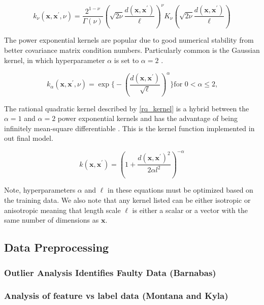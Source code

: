 \documentclass[journal=jacsat,manuscript=article]{achemso}
\begin{document}
\begin{equation}
    k_\nu(\mathbf{x}, \mathbf{x}^{\prime}, \nu) = \frac{2^{1-\nu}}{\Gamma(\nu)} \left( \sqrt{2\nu} \frac{d(\mathbf{x}, \mathbf{x}^{\prime})}{\ell} \right)^\nu K_\nu \left( \sqrt{2\nu} \frac{d(\mathbf{x}, \mathbf{x}^{\prime})}{\ell} \right)
    \label{Matern}
\end{equation}

The power exponential kernels are popular due to good numerical stability from better covariance matrix condition numbers. Particularly common is the Gaussian kernel, in which hyperparameter $\alpha$ is set to $\alpha = 2$ \cite{Gramacy2020Surrogates:Sciences}. 

\begin{equation}
    k_{\alpha}(\mathbf{x}, \mathbf{x}^{\prime}, \nu) = \exp \Biggl\{- \left( \frac{d(\mathbf{x}, \mathbf{x}^{\prime})}{\sqrt{\ell}} \right)^\alpha \Biggl\} \text{for $0<\alpha \leq 2$,}
    \label{Exp_kernel}
\end{equation}

The rational quadratic kernel described by \eqref{rq_kernel} is a hybrid between the $\alpha = 1$ and $\alpha =2$ power exponential kernels and has the advantage of being infinitely mean-square differentiable \cite{Gramacy2020Surrogates:Sciences}. This is the kernel function implemented in out final model.

\begin{equation}
    k(\mathbf{x}, \mathbf{x}^{\prime}) = \left(1 + \frac{d(\mathbf{x}, \mathbf{x}^{\prime})^2}{2\alpha l^2}\right)^{-\alpha}
    \label{rq_kernel}
\end{equation}

Note, hyperparameters $\alpha$ and $\ell$ in these equations must be optimized based on the training data. We also note that any kernel listed can be either isotropic or anisotropic meaning that length scale $\ell$ is either a scalar or a vector with the same number of dimensions as $\mathbf{x}$.

\subsection{Data Preprocessing}

\subsubsection{Outlier Analysis Identifies Faulty Data (Barnabas)} 

\subsubsection{Analysis of feature vs label data (Montana and Kyla) }
\end{document}
